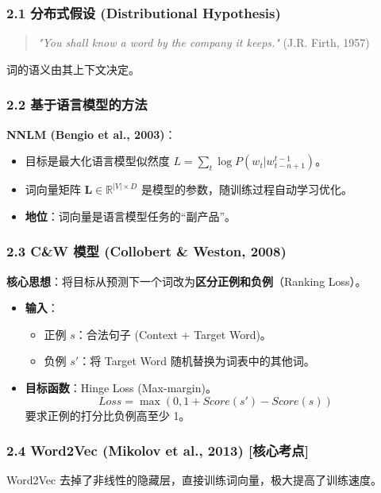 \documentclass[a4paper, 11pt]{ctexart}
\begin{document}
\subsubsection{2.1 分布式假设 (Distributional Hypothesis)}
\begin{quote}
    \textit{"You shall know a word by the company it keeps."} (J.R. Firth, 1957)
\end{quote}
词的语义由其上下文决定。

\subsubsection{2.2 基于语言模型的方法}
\textbf{NNLM (Bengio et al., 2003)}：
\begin{itemize}
    \item 目标是最大化语言模型似然度 $L = \sum_t \log P(w_t | w_{t-n+1}^{t-1})$。
    \item 词向量矩阵 $\mathbf{L} \in \mathbb{R}^{|V| \times D}$ 是模型的参数，随训练过程自动学习优化。
    \item \textbf{地位}：词向量是语言模型任务的“副产品”。
\end{itemize}

\subsubsection{2.3 C\&W 模型 (Collobert \& Weston, 2008)}
\textbf{核心思想}：将目标从预测下一个词改为\textbf{区分正例和负例}（Ranking Loss）。
\begin{itemize}
    \item \textbf{输入}：
    \begin{itemize}
        \item 正例 $s$：合法句子 (Context + Target Word)。
        \item 负例 $s'$：将 Target Word 随机替换为词表中的其他词。
    \end{itemize}
    \item \textbf{目标函数}：Hinge Loss (Max-margin)。
    \begin{equation}
        Loss = \max(0, 1 + Score(s') - Score(s))
    \end{equation}
    要求正例的打分比负例高至少 1。
\end{itemize}

\subsubsection{2.4 Word2Vec (Mikolov et al., 2013) [核心考点]}
% 
Word2Vec 去掉了非线性的隐藏层，直接训练词向量，极大提高了训练速度。
\end{document}
